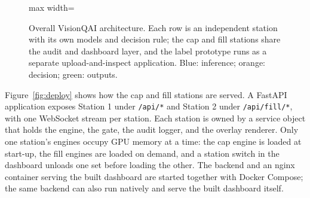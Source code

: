 \begin{figure}[htbp]
\begin{adjustbox}{max width=\textwidth}
\end{adjustbox}
\caption[Overall VisionQAI architecture]{Overall VisionQAI architecture. Each row is an independent station with its own models and decision rule; the cap and fill stations share the audit and dashboard layer, and the label prototype runs as a separate upload-and-inspect application. Blue: inference; orange: decision; green: outputs.}
\label{fig:system-architecture}
\end{figure}

Figure~\ref{fig:deploy} shows how the cap and fill stations are served. A FastAPI application exposes Station 1 under \texttt{/api/*} and Station 2 under \texttt{/api/fill/*}, with one WebSocket stream per station. Each station is owned by a service object that holds the engine, the gate, the audit logger, and the overlay renderer. Only one station's engines occupy GPU memory at a time: the cap engine is loaded at start-up, the fill engines are loaded on demand, and a station switch in the dashboard unloads one set before loading the other. The backend and an nginx container serving the built dashboard are started together with Docker Compose; the same backend can also run natively and serve the built dashboard itself.

